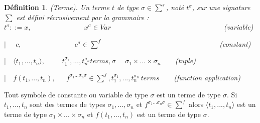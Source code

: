 \documentclass[9pt]{book}
\newtheorem{definition}{D\'efinition}[section]
\begin{document}
\begin{definition} (Terme).
Un terme $t$ de type $\sigma \in \sum^{s}$, not\'e $t^{\sigma}$, sur une signature $\sum$ est d\'efini r\'ecrusivement par la grammaire :\\
$t^{\sigma} ::= x,$ ~~~~~~~~~~~~~~$x^{\sigma} \in Var$ ~~~~~~~~~~~~~~~~~~~~~~~~~~~~~~ (variable) \par
$|$~~ $c,$ ~~~~~~~~~~~~~~$c^{\sigma} \in \sum^{f}$ ~~~~~~~~~~~~~~~~~~~~~~~~~~~~~~~~(constant) \par
$|$~~$\langle t_{1},...,t_{n}\rangle,$~~~~ $t_{1}^{\sigma_{1}},...,t_{n}^{\sigma_{n}} terms, \sigma = \sigma_{1} \times ... \times \sigma_{n}$~~~~(tuple) \par
$|$~~$f(t_{1},...,t_{n}),$~~~$f^{\sigma_{1} ...\sigma_{n} \sigma} \in \sum^{f}, t_{1}^{\sigma_{1}},...,t_{n}^{\sigma_{n}} ~terms$~~~~(function application)
\end{definition}
	Tout symbole de constante ou variable de type $\sigma$ est un terme de type $\sigma$. Si $t_{1},...,t_{n}$ sont des termes de types $\sigma_{1},...,\sigma_{n}$ et $f^{\sigma_{1} ...\sigma_{n} \sigma} \in \sum^{f}$ alors $\langle t_{1},...,t_{n}\rangle$ est un terme de type $\sigma_{1} \times ... \times \sigma_{n}$ et $f(t_{1},...,t_{n})$ est un terme de type $\sigma$.\par
\end{document}
